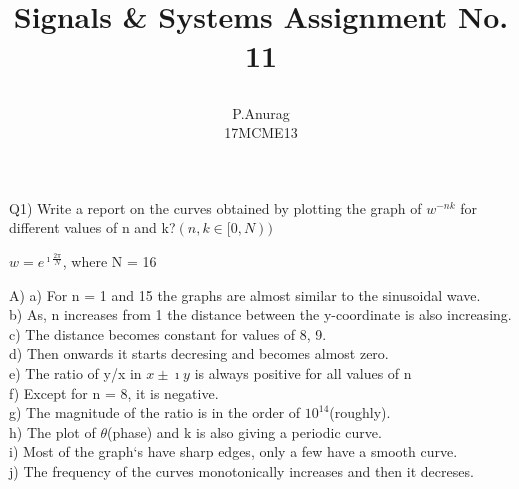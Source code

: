 \documentclass[a4paper,12pt]{article}
\title{
  \begin{large}
    Signals \& Systems
    Assignment No. 11
  \end{large}
}
\author{P.Anurag\\ 17MCME13}
\begin{document}
\maketitle
  \begin{flushleft}
    \large{Q1) Write a report on the curves obtained by plotting the graph of 
    $w^{-nk}$ for different values of n and k?$ (n, k\in [0,N))$}\\
  \end{flushleft}
  \begin{center}
    $w = e^{\imath\frac{2\pi}{N}}$, where N = 16\\
  \end{center}

  \large{A) }
  a) For n = 1 and 15 the graphs are almost similar to the sinusoidal wave.\\
  b) As, n increases from 1 the distance between the y-coordinate 
     is also increasing.\\
  c) The distance becomes constant for values of 8, 9.\\
  d) Then onwards it starts decresing and becomes almost zero.\\
  e) The ratio of y/x in $x\pm\imath y$ is always positive for all values of n\\
  f) Except for n = 8, it is negative.\\
  g) The magnitude of the ratio is in the order of $10^{14}$(roughly).\\
  h) The plot of $\theta$(phase) and k is also giving a periodic curve.\\
  i) Most of the graph`s have sharp edges, only a few have a smooth curve.\\
  j) The frequency of the curves monotonically increases and then it decreses.\\
\end{document}
